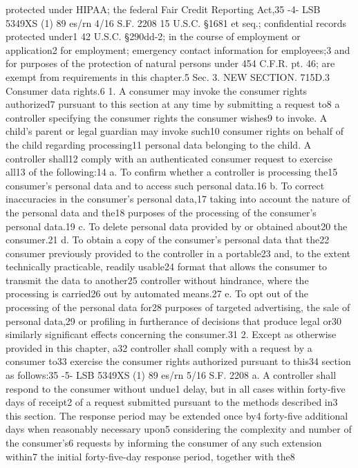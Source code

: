 protected under HIPAA; the federal Fair Credit Reporting Act,35
-4-
LSB 5349XS (1) 89
es/rn 4/16
S.F. 2208
15 U.S.C. §1681 et seq.; confidential records protected under1
42 U.S.C. §290dd-2; in the course of employment or application2
for employment; emergency contact information for employees;3
and for purposes of the protection of natural persons under 454
C.F.R. pt. 46; are exempt from requirements in this chapter.5
Sec. 3. NEW SECTION. 715D.3 Consumer data rights.6
1. A consumer may invoke the consumer rights authorized7
pursuant to this section at any time by submitting a request to8
a controller specifying the consumer rights the consumer wishes9
to invoke. A child’s parent or legal guardian may invoke such10
consumer rights on behalf of the child regarding processing11
personal data belonging to the child. A controller shall12
comply with an authenticated consumer request to exercise all13
of the following:14
a. To confirm whether a controller is processing the15
consumer’s personal data and to access such personal data.16
b. To correct inaccuracies in the consumer’s personal data,17
taking into account the nature of the personal data and the18
purposes of the processing of the consumer’s personal data.19
c. To delete personal data provided by or obtained about20
the consumer.21
d. To obtain a copy of the consumer’s personal data that the22
consumer previously provided to the controller in a portable23
and, to the extent technically practicable, readily usable24
format that allows the consumer to transmit the data to another25
controller without hindrance, where the processing is carried26
out by automated means.27
e. To opt out of the processing of the personal data for28
purposes of targeted advertising, the sale of personal data,29
or profiling in furtherance of decisions that produce legal or30
similarly significant effects concerning the consumer.31
2. Except as otherwise provided in this chapter, a32
controller shall comply with a request by a consumer to33
exercise the consumer rights authorized pursuant to this34
section as follows:35
-5-
LSB 5349XS (1) 89
es/rn 5/16
S.F. 2208
a. A controller shall respond to the consumer without undue1
delay, but in all cases within forty-five days of receipt2
of a request submitted pursuant to the methods described in3
this section. The response period may be extended once by4
forty-five additional days when reasonably necessary upon5
considering the complexity and number of the consumer’s6
requests by informing the consumer of any such extension within7
the initial forty-five-day response period, together with the8
